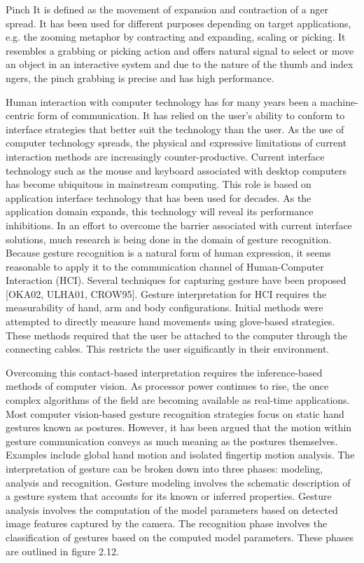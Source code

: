 Pinch It is defined as the movement of expansion and contraction of a nger spread. It has been used for different purposes depending on target applications, e.g. the zooming metaphor by contracting and expanding, scaling or picking. It resembles a grabbing or picking action and offers natural signal to select or move an object in an interactive system and due to the nature of the thumb and index ngers, the pinch grabbing is precise and has high performance.


Human interaction with computer technology has for many years been a machine-centric form of communication. It has relied on the user’s ability to conform to interface strategies that better suit the technology than the user. As the use of computer technology spreads, the physical and expressive limitations of current interaction methods are increasingly counter-productive. Current interface technology such as the mouse and keyboard associated with desktop computers has become ubiquitous in mainstream computing. This role is based on application interface technology that has been used for decades. As the application domain expands, this technology will reveal its performance inhibitions. In an effort to overcome the barrier associated with current interface solutions, much research is being done in the domain of gesture recognition. Because gesture recognition is a natural form of human expression, it seems reasonable to apply it to the communication channel of Human-Computer Interaction (HCI). Several techniques for capturing gesture have been proposed [OKA02, ULHA01, CROW95]. Gesture interpretation for HCI requires the measurability of hand, arm and body configurations. Initial methods were attempted to directly measure hand movements using glove-based strategies. These methods required that the user be attached to the computer through the connecting cables. This restricts the user significantly in their environment.

Overcoming this contact-based interpretation requires the inference-based methods of computer vision. As processor power continues to rise, the once complex algorithms of the field are becoming available as real-time applications. Most computer vision-based gesture recognition strategies focus on static hand gestures known as postures. However, it has been argued that the motion within gesture communication conveys as much meaning as the postures themselves. Examples include global hand motion and isolated fingertip motion analysis. The interpretation of gesture can be broken down into three phases: modeling, analysis and recognition. Gesture modeling involves the schematic description of a gesture system that accounts for its known or inferred properties. Gesture analysis involves the computation of the model parameters based on detected image features captured by the camera. The recognition phase involves the classification of gestures based on the computed model parameters. These phases are outlined in figure 2.12.

